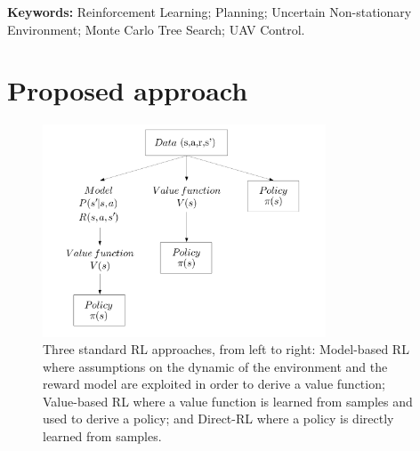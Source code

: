 \documentclass[]{article}
\begin{document}



\noindent \textbf{Keywords:} Reinforcement Learning; Planning; Uncertain Non-stationary Environment; Monte Carlo Tree Search; UAV Control.

\section{Proposed approach}

\begin{figure}[!h]
	\centering
	\includegraphics[width=0.75\textwidth]{img/RL_big_picture.png}
	\caption{Three standard RL approaches, from left to right: Model-based RL where assumptions on the dynamic of the environment and the reward model are exploited in order to derive a value function; Value-based RL where a value function is learned from samples and used to derive a policy; and Direct-RL where a policy is directly learned from samples.}
	\label{RL_big_picture}
\end{figure}
\end{document}
